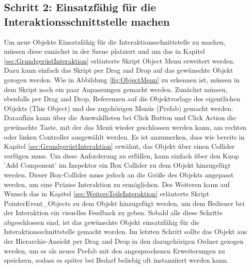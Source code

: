 \subsection{Schritt 2: Einsatzfähig für die Interaktionsschnittstelle machen}\label{sec:ObjekteEinbinden2}
Um neue Objekte Einsatzfähig für die Interaktionsschnittstelle zu machen, müssen diese zunächst in der Szene platziert und um das in Kapitel \ref{sec:GrundgerüstInteraktion} erläuterte Skript Object Menu erweitert werden. Dazu kann einfach das Skript per Drag and Drop auf das gewünschte Objekt gezogen werden. Wie in Abbildung \ref{fig:ObjectMenu} zu erkennen ist, müssen in dem Skript noch ein paar Anpassungen gemacht werden. Zunächst müssen, ebenfalls per Drag and Drop, Referenzen auf die Objektvorlage des eigentlichen Objekts (This Object) und des zugehörigen Menüs (Prefab) gemacht werden. Daraufhin kann über die Auswahllisten bei Click Button und Click Action die gewünschte Taste, mit der das Menü wieder geschlossen werden kann, am rechten oder linken Controller ausgewählt werden. Es ist anzumerken, dass wie bereits in Kapitel \ref{sec:GrundgerüstInteraktion} erwähnt, das Objekt über einen Collider verfügen muss. Um diese Anforderung zu erfüllen, kann einfach über den Knop 'Add Component' im Inspektor ein Box Collider zu dem Objekt hinzugefügt werden. Dieser Box-Collider muss jedoch an die Größe des Objekts angepasst werden, um eine Präzise Interaktion zu ermöglichen. Des Weiteren kann auf Wunsch das in Kapitel \ref{sec:WeitereTeileInteraktion} erläuterte Skript PointerEvent\_Objects zu dem Objekt hinzugefügt werden, um dem Bediener bei der Interaktion ein visuelles Feedback zu geben. Sobald alle diese Schritte abgeschlossen sind, ist das gewünschte Objekt einsatzfähig für die Interaktionsschnittstelle gemacht worden. Im letzten Schritt sollte das Objekt aus der Hierarchie-Ansicht per Drag and Drop in den dazugehörigen Ordner gezogen werden, um es als neues Prefab mit den angesprochenen Erweiterungen zu speichern, sodass es später bei Bedarf beliebig oft instanziiert werden kann.

